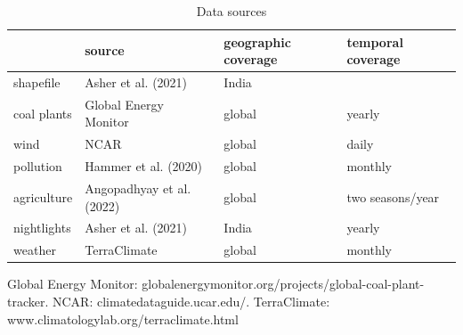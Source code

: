 \documentclass[
]{article}
\begin{document}
\begin{table}[H]

\caption{\label{tab:data}Data sources}
\centering
\begin{threeparttable}
\begin{tabular}[t]{>{\raggedright\arraybackslash}p{2cm}>{\centering\arraybackslash}p{4.5cm}>{\centering\arraybackslash}p{3.5cm}>{\centering\arraybackslash}p{3.5cm}}
\toprule
  & source & geographic coverage & temporal coverage\\
\midrule
shapefile & Asher et al. (2021) & India & \\
coal plants & Global Energy Monitor & global & yearly\\
wind & NCAR & global & daily\\
pollution & Hammer et al. (2020) & global & monthly\\
agriculture & Angopadhyay et al. (2022) & global & two seasons/year\\
nightlights & Asher et al. (2021) & India & yearly\\
weather & TerraClimate & global & monthly\\
\bottomrule
\end{tabular}
\begin{tablenotes}[para]
\item Global Energy Monitor: globalenergymonitor.org/projects/global-coal-plant-tracker. NCAR: climatedataguide.ucar.edu/. TerraClimate: www.climatologylab.org/terraclimate.html
\end{tablenotes}
\end{threeparttable}
\end{table}
\end{document}
